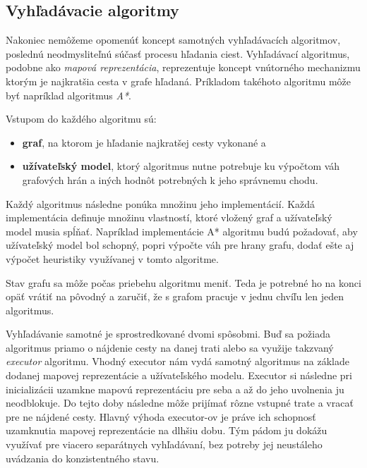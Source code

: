 \subsection{Vyhľadávacie algoritmy}\label{vyhladavacie_algoritmy}

Nakoniec nemôžeme opomenúť koncept samotných vyhľadávacích algoritmov, poslednú neodmysliteľnú súčasť procesu hľadania ciest. Vyhľadávací algoritmus, podobne ako \textit{mapová reprezentácia}, reprezentuje koncept vnútorného mechanizmu ktorým je najkratšia cesta v grafe hľadaná. Príkladom takéhoto algoritmu môže byť napríklad algoritmus \textit{A*}. 

Vstupom do každého algoritmu sú:
\begin{itemize}
    \item \textbf{graf}, na ktorom je hľadanie najkratšej cesty vykonané a 
    \item \textbf{užívateľský model}, ktorý algoritmus nutne potrebuje ku výpočtom váh grafových hrán a iných hodnôt potrebných k jeho správnemu chodu.  
\end{itemize}

Každý algoritmus následne ponúka množinu jeho implementácií. Každá implementácia definuje množinu vlastností, ktoré vložený graf a užívateľský model musia spĺňať. Napríklad implementácie A* algoritmu budú požadovať, aby užívateľský model bol schopný, popri výpočte váh pre hrany grafu, dodať ešte aj výpočet heuristiky využívanej v tomto algoritme.

Stav grafu sa môže počas priebehu algoritmu meniť. Teda je potrebné ho na konci opäť vrátiť na pôvodný a zaručiť, že s grafom pracuje v jednu chvíľu len jeden algoritmus.

Vyhľadávanie samotné je sprostredkované dvomi spôsobmi. Buď sa požiada algoritmus priamo o nájdenie cesty na danej trati alebo sa využije takzvaný \textit{executor} algoritmu. Vhodný executor nám vydá samotný algoritmus na základe dodanej mapovej reprezentácie a užívateľského modelu. Executor si následne pri inicializácii uzamkne mapovú reprezentáciu pre seba a až do jeho uvolnenia ju neodblokuje. Do tejto doby následne môže prijímať rôzne vstupné trate a vracať pre ne nájdené cesty. Hlavný výhoda executor-ov je práve ich schopnosť uzamknutia mapovej reprezentácie na dlhšiu dobu. Tým pádom ju dokážu využívať pre viacero separátnych vyhľadávaní, bez potreby jej neustáleho uvádzania do konzistentného stavu.  


